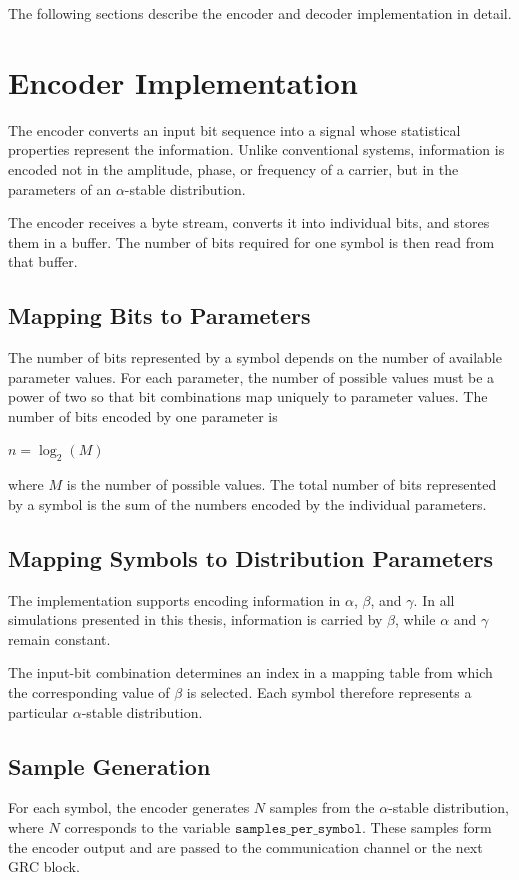 \documentclass[a4paper, 12pt, openany]{book}
\begin{document}
The following sections describe the encoder and decoder implementation in detail.


\section{Encoder Implementation}

The encoder converts an input bit sequence into a signal whose statistical properties represent the information. Unlike conventional systems, information is encoded not in the amplitude, phase, or frequency of a carrier, but in the parameters of an $\alpha$-stable distribution.

The encoder receives a byte stream, converts it into individual bits, and stores them in a buffer. The number of bits required for one symbol is then read from that buffer.

\subsection{Mapping Bits to Parameters}

The number of bits represented by a symbol depends on the number of available parameter values. For each parameter, the number of possible values must be a power of two so that bit combinations map uniquely to parameter values. The number of bits encoded by one parameter is

$n = \log_2(M)$

where $M$ is the number of possible values. The total number of bits represented by a symbol is the sum of the numbers encoded by the individual parameters.

\subsection{Mapping Symbols to Distribution Parameters}
The implementation supports encoding information in $\alpha$, $\beta$, and $\gamma$. In all simulations presented in this thesis, information is carried by $\beta$, while $\alpha$ and $\gamma$ remain constant.

The input-bit combination determines an index in a mapping table from which the corresponding value of $\beta$ is selected. Each symbol therefore represents a particular $\alpha$-stable distribution.

\subsection{Sample Generation}
For each symbol, the encoder generates $N$ samples from the $\alpha$-stable distribution, where $N$ corresponds to the variable $\texttt{samples\_per\_symbol}$. These samples form the encoder output and are passed to the communication channel or the next GRC block.
\end{document}
